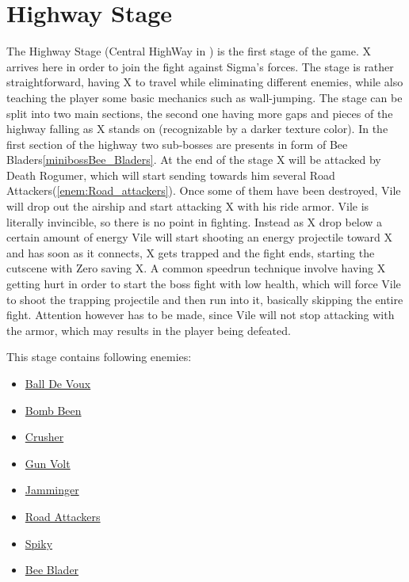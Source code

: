 \section{Highway Stage}
The Highway Stage (Central HighWay in \mhx) is the first stage of the game. X arrives here in order to join the fight against Sigma's forces. The stage is rather straightforward, having X to travel while eliminating different enemies, while also teaching the player some basic mechanics such as wall-jumping.  The stage can be split into two main sections\cite{stratwiki:HighWay}, the second one having more gaps and pieces of the highway falling as X stands on (recognizable by a darker texture color). In the first section of the highway two sub-bosses are presents in form of Bee Bladers\ref{minibossBee_Bladers}. At the end of the stage X will be attacked by Death Rogumer, which will start sending towards him several Road Attackers(\ref{enem:Road_attackers}). Once some of them have been destroyed, Vile will drop out the airship and start attacking X with his ride armor. Vile is literally invincible, so there is no point in fighting. Instead as X drop below a certain amount of energy Vile will start shooting an energy projectile toward X and has soon as it connects, X gets trapped and the fight ends, starting the cutscene with Zero saving X. A common speedrun  technique involve having X getting hurt in order to start the boss fight with low health, which will force Vile to shoot the trapping projectile and then run into it, basically skipping the entire fight. Attention however has to be made, since Vile will not stop attacking with the armor, which may results in the player being defeated.

This stage contains following enemies\cite{wiki:Highway}:
\begin{itemize}
	\item \hyperlink{enem:Ball_De_Voux}{Ball De Voux }
	\item \hyperlink{enem:Bomb_Been}{Bomb Been }
	\item \hyperlink{enem:Crusher}{Crusher }
	\item \hyperlink{enem:Gun_Volt}{Gun Volt}
	\item \hyperlink{enem:Jamminger}{Jamminger}
	\item \hyperlink{enem:Road_Attackers}{Road Attackers }
	\item \hyperlink{enem:Spiky}{Spiky }
	\item \hyperlink{miniboss:Bee_Blader}{Bee Blader }
\end{itemize}
 
